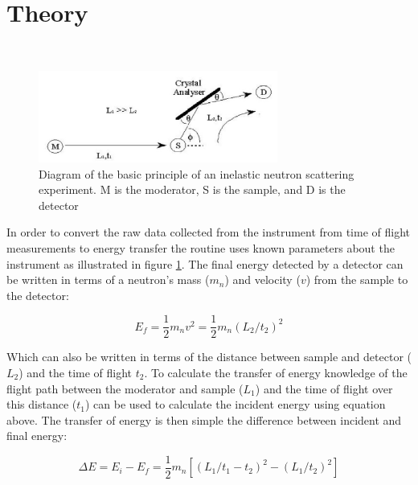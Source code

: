 \documentclass[paper=a4, fontsize=11pt]{scrartcl}	%
\numberwithin{equation}{section}															%
\numberwithin{figure}{section}																%
\numberwithin{table}{section}																%
\begin{document}
\section{Theory}
\mbox{ }\\
\begin{figure}[H]
\centering
\includegraphics[width=0.7\textwidth]{img/instrument-diagram.png}
\caption{Diagram of the basic principle of an inelastic neutron scattering experiment. M is the moderator, S is the sample, and D is the detector \cite{smukhopadhyay2014}}
\label{fig:instrument-setup}
\end{figure}

In order to convert the raw data collected from the instrument from time of flight measurements to energy transfer the routine uses known parameters about the instrument as illustrated in figure \ref{fig:instrument-setup}. The final energy detected by a detector can be written in terms of a neutron's mass ($m_{n}$) and velocity ($v$) from the sample to the detector:

\begin{equation}
E_f = \frac{1}{2}m_{n}v^2 = \frac{1}{2}m_{n} ( L_2 / t_2 ) ^2
\end{equation}

Which can also be written in terms of the distance between sample and detector ($L_2$) and the time of flight $t_2$. To calculate the transfer of energy knowledge of the flight path between the moderator and sample ($L_1$) and the time of flight over this distance ($t_1$) can be used to calculate the incident energy using equation above. The transfer of energy is then simple the difference between incident and final energy:

\begin{equation}
\Delta E = E_i - E_f = \frac{1}{2}m_n[(L_1 / t_1-t_2)^2 - (L_1/t_2)^2]
\end{equation}
\end{document}
